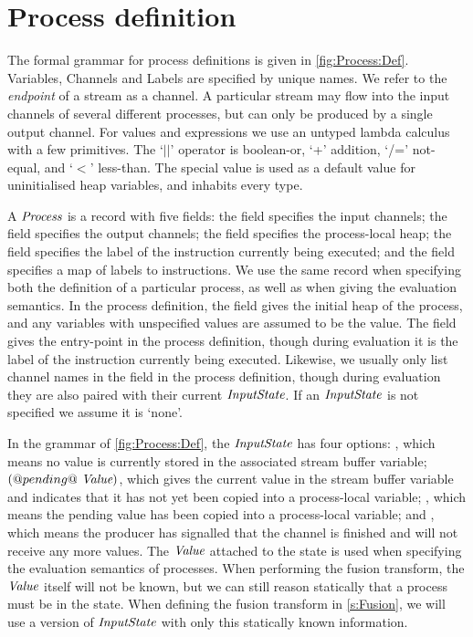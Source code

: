 \section{Process definition}
\label{kpn/process-definition}



The formal grammar for process definitions is given in \cref{fig:Process:Def}.
Variables, Channels and Labels are specified by unique names.
We refer to the \emph{endpoint} of a stream as a channel.
A particular stream may flow into the input channels of several different processes, but can only be produced by a single output channel.
For values and expressions we use an untyped lambda calculus with a few primitives.
The `$||$' operator is boolean-or, `+' addition, `/=' not-equal, and `$<$' less-than.
The special \lstiproc@uninitialised@ value is used as a default value for uninitialised heap variables, and inhabits every type.

A $\textit{Process}$ is a record with five fields: the \lstiproc@ins@ field specifies the input channels; the \lstiproc@outs@ field specifies the output channels; the \lstiproc@heap@ field specifies the process-local heap; the \lstiproc@label@ field specifies the label of the instruction currently being executed; and the \lstiproc@instrs@ field specifies a map of labels to instructions.
We use the same record when specifying both the definition of a particular process, as well as when giving the evaluation semantics.
In the process definition, the \lstiproc@heap@ field gives the initial heap of the process, and any variables with unspecified values are assumed to be the \lstiproc@uninitialised@ value.
The \lstiproc@label@ field gives the entry-point in the process definition, though during evaluation it is the label of the instruction currently being executed.
Likewise, we usually only list channel names in the \lstiproc@ins@ field in the process definition, though during evaluation they are also paired with their current $\textit{InputState}$.
If an $\textit{InputState}$ is not specified we assume it is `none'.

In the grammar of \cref{fig:Process:Def}, the $\textit{InputState}$ has four options: \lstiproc@none@, which means no value is currently stored in the associated stream buffer variable; $(@pending@~\textit{Value})$, which gives the current value in the stream buffer variable and indicates that it has not yet been copied into a process-local variable; \lstiproc@have@, which means the pending value has been copied into a process-local variable; and \lstiproc@closed@, which means the producer has signalled that the channel is finished and will not receive any more values.
The $\textit{Value}$ attached to the \lstiproc@pending@ state is used when specifying the evaluation semantics of processes.
When performing the fusion transform, the $\textit{Value}$ itself will not be known, but we can still reason statically that a process must be in the \lstiproc@pending@ state.
When defining the fusion transform in \cref{s:Fusion}, we will use a version of $\textit{InputState}$ with only this statically known information.

